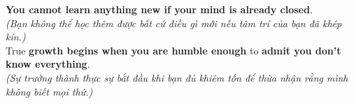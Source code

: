 \begin{baihoc}
  \textbf{You cannot learn anything new if your mind is already closed}.\\
  \textit{(Bạn không thể học thêm được bất cứ điều gì mới nếu tâm trí của bạn đã khép kín.)}\\
  True \textbf{growth begins when you are humble enough} to \textbf{admit you don't know everything}.\\
  \textit{(Sự trưởng thành thực sự bắt đầu khi bạn đủ khiêm tốn để thừa nhận rằng mình không biết mọi thứ.)}
\end{baihoc}

\vspace{0.8cm}


\ngayDay{}

